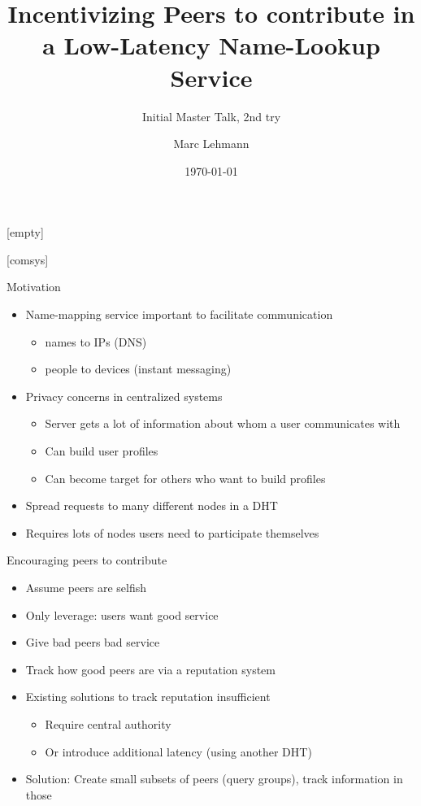 \documentclass[presentation,english,usenames,dvipsnames]{beamer}
\title[Peer-to-Peer Incentives]{Incentivizing Peers to contribute in a
Low-Latency Name-Lookup Service}
\author{Marc Lehmann}
\subtitle{Initial Master Talk, 2nd try}
\date{\today}
\begin{document}
[empty]
\begin{frame}
  \titlepage
\end{frame}

[comsys]

\begin{frame}{Motivation}
  \begin{itemize}
    \item Name-mapping service important to facilitate communication
    \begin{itemize}
      \item names to IPs (DNS)
      \item people to devices (instant messaging)
    \end{itemize}
    \item Privacy concerns in centralized systems
    \begin{itemize}
      \item Server gets a lot of information about whom a user communicates with
      \item Can build user profiles
      \item Can become target for others who want to build profiles
    \end{itemize}
    \item Spread requests to many different nodes in a DHT
    \item Requires lots of nodes \rightarrow users need to participate
          themselves
  \end{itemize}
\end{frame}

\begin{frame}{Encouraging peers to contribute}
  \begin{itemize}
    \item Assume peers are selfish
    \item Only leverage: users want good service
    \item Give bad peers bad service
    \item Track how good peers are via a reputation system
    \item Existing solutions to track reputation insufficient
    \begin{itemize}
      \item Require central authority
      \item Or introduce additional latency (using another DHT)
    \end{itemize}
    \item Solution: Create small subsets of peers (query groups), track
          information in those
  \end{itemize}
\end{frame}
\end{document}
